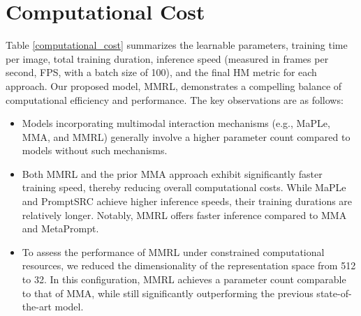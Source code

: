 \section{Computational Cost}
Table \ref{computational_cost} summarizes the learnable parameters, training time per image, total training duration, inference speed (measured in frames per second, FPS, with a batch size of 100), and the final HM metric for each approach. Our proposed model, MMRL, demonstrates a compelling balance of computational efficiency and performance. The key observations are as follows:
\begin{itemize}
    \item Models incorporating multimodal interaction mechanisms (e.g., MaPLe, MMA, and MMRL) generally involve a higher parameter count compared to models without such mechanisms.
    \item Both MMRL and the prior MMA approach exhibit significantly faster training speed, thereby reducing overall computational costs. While MaPLe and PromptSRC achieve higher inference speeds, their training durations are relatively longer. Notably, MMRL offers faster inference compared to MMA and MetaPrompt.
    \item To assess the performance of MMRL under constrained computational resources, we reduced the dimensionality of the representation space from 512 to 32. In this configuration, MMRL achieves a parameter count comparable to that of MMA, while still significantly outperforming the previous state-of-the-art model.
\end{itemize}



